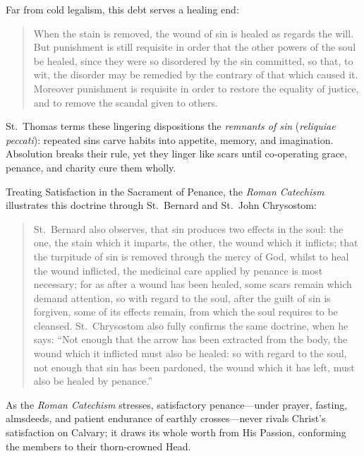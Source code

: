 Far from cold legalism, this debt serves a healing end:

\begin{quote}
When the stain is removed, the wound of sin is healed as regards the will. But punishment is still requisite in order that the other powers of the soul be healed, since they were so disordered by the sin committed, so that, to wit, the disorder may be remedied by the contrary of that which caused it. Moreover punishment is requisite in order to restore the equality of justice, and to remove the scandal given to others.
\end{quote}

St.\ Thomas terms these lingering dispositions the \textit{remnants of sin} (\textit{reliquiae peccati}): repeated sins carve habits into appetite, memory, and imagination. Absolution breaks their rule, yet they linger like scars until co-operating grace, penance, and charity cure them wholly.

Treating Satisfaction in the Sacrament of Penance, the \textit{Roman Catechism} illustrates this doctrine through St.\ Bernard and St.\ John Chrysostom:

\begin{quote}
St.\ Bernard also observes, that sin produces two effects in the soul: the one, the stain which it imparts, the other, the wound which it inflicts; that the turpitude of sin is removed through the mercy of God, whilst to heal the wound inflicted, the medicinal care applied by penance is most necessary; for as after a wound has been healed, some scars remain which demand attention, so with regard to the soul, after the guilt of sin is forgiven, some of its effects remain, from which the soul requires to be cleansed. St.\ Chrysostom also fully confirms the same doctrine, when he says: ``Not enough that the arrow has been extracted from the body, the wound which it inflicted must also be healed: so with regard to the soul, not enough that sin has been pardoned, the wound which it has left, must also be healed by penance.''
\end{quote}

As the \textit{Roman Catechism} stresses, satisfactory penance---under prayer, fasting, almsdeeds, and patient endurance of earthly crosses---never rivals Christ's satisfaction on Calvary; it draws its whole worth from His Passion, conforming the members to their thorn-crowned Head.

